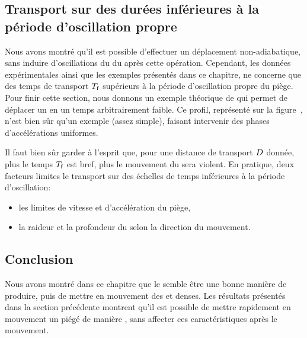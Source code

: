 \subsection{Transport sur des durées inférieures à la période d'oscillation propre}
Nous avons montré qu'il est possible d'effectuer un déplacement non-adiabatique, sans induire d'oscillations du \cdm du \n après cette opération. Cependant, les données expérimentales ainsi que les exemples présentés dans ce chapitre, ne concerne que des temps de transport ${T_{\rm f}}$ supérieurs à la période d'oscillation propre du piège.
Pour finir cette section, nous donnons un exemple théorique de \pacc qui permet de déplacer un \n en un temps arbitrairement faible. 
Ce profil, représenté sur la figure~, n'est bien sûr qu'un exemple (assez simple), faisant intervenir des phases d'accélérations uniformes.
%
\bfighs
{}\\
\RemonteUnPeuFig
\RemonteUnPeuFig
{}
\label{fig:TransportUltraRapide}
\efigh


Il faut bien sûr garder à l'esprit que, pour une distance de transport ${D}$ donnée, plus le temps ${T_{\rm f}}$ est bref, plus le mouvement du \pd sera violent. En pratique, deux facteurs limites le transport sur des échelles de temps inférieures à la période d'oscillation:
\begin{itemize}
	\item les limites de vitesse et d'accélération du piège,
	\item la raideur et la profondeur du \pc selon la direction du mouvement.
\end{itemize}


\casse


\subsection{Conclusion}%

Nous avons montré dans ce chapitre que le \fld semble être une bonne manière de produire, puis de mettre en mouvement des \patufs et denses. 
Les résultats présentés dans la section précédente montrent qu'il est possible de mettre rapidement en mouvement un \nat piégé de manière , \cad sans affecter ces caractéristiques après le mouvement.

